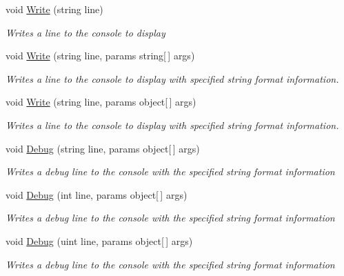 \begin{DoxyCompactItemize}
void \hyperlink{class_m_b2_d_1_1_m_b_console_a1d85081cb5400f09883c1fc62f37d861}{Write} (string line)
\begin{DoxyCompactList}\small\item\em Writes a line to the console to display \end{DoxyCompactList}\item 
void \hyperlink{class_m_b2_d_1_1_m_b_console_a77bc48284eeebbc13eeced6451513c09}{Write} (string line, params string\mbox{[}$\,$\mbox{]} args)
\begin{DoxyCompactList}\small\item\em Writes a line to the console to display with specified string format information. \end{DoxyCompactList}\item 
void \hyperlink{class_m_b2_d_1_1_m_b_console_ad7f7617e28472374b97fee653bd786be}{Write} (string line, params object\mbox{[}$\,$\mbox{]} args)
\begin{DoxyCompactList}\small\item\em Writes a line to the console to display with specified string format information. \end{DoxyCompactList}\item 
void \hyperlink{class_m_b2_d_1_1_m_b_console_a6f0c0f179b2fef32a130a5e1d4957a70}{Debug} (string line, params object\mbox{[}$\,$\mbox{]} args)
\begin{DoxyCompactList}\small\item\em Writes a debug line to the console with the specified string format information \end{DoxyCompactList}\item 
void \hyperlink{class_m_b2_d_1_1_m_b_console_a1235820bedb1bc0598c863a0d7033329}{Debug} (int line, params object\mbox{[}$\,$\mbox{]} args)
\begin{DoxyCompactList}\small\item\em Writes a debug line to the console with the specified string format information \end{DoxyCompactList}\item 
void \hyperlink{class_m_b2_d_1_1_m_b_console_aef53935b8ae3c6cd2b87a81e5dbcdf1e}{Debug} (uint line, params object\mbox{[}$\,$\mbox{]} args)
\begin{DoxyCompactList}\small\item\em Writes a debug line to the console with the specified string format information \end{DoxyCompactList}\item 

\end{DoxyCompactItemize}
